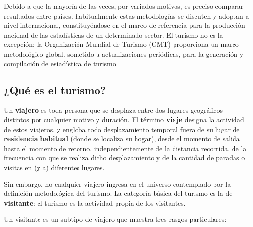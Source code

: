 \documentclass[
]{book}
\begin{document}
Debido a que la mayoría de las veces, por variados motivos, es preciso comparar resultados entre países, habitualmente estas metodologías se discuten y adoptan a nivel internacional, constituyéndose en el marco de referencia para la producción nacional de las estadísticas de un determinado sector. El turismo no es la excepción: la Organización Mundial de Turismo (OMT) proporciona un marco metodológico global, sometido a actualizaciones periódicas, para la generación y compilación de estadística de turismo.

\hypertarget{quuxe9-es-el-turismo}{%
\subsection{¿Qué es el turismo?}\label{quuxe9-es-el-turismo}}

Un \textbf{viajero} es toda persona que se desplaza entre dos lugares geográficos distintos por cualquier motivo y duración. El término \textbf{viaje} designa la actividad de estos viajeros, y engloba todo desplazamiento temporal fuera de su lugar de \textbf{residencia} \textbf{habitual} (donde se localiza su hogar), desde el momento de salida hasta el momento de retorno, independientemente de la distancia recorrida, de la frecuencia con que se realiza dicho desplazamiento y de la cantidad de paradas o visitas en (y a) diferentes lugares.

Sin embargo, no cualquier viajero ingresa en el universo contemplado por la definición metodológica del turismo. La categoría básica del turismo es la de \textbf{visitante}: el turismo es la actividad propia de los visitantes.

Un visitante es un subtipo de viajero que muestra tres rasgos particulares:
\end{document}
